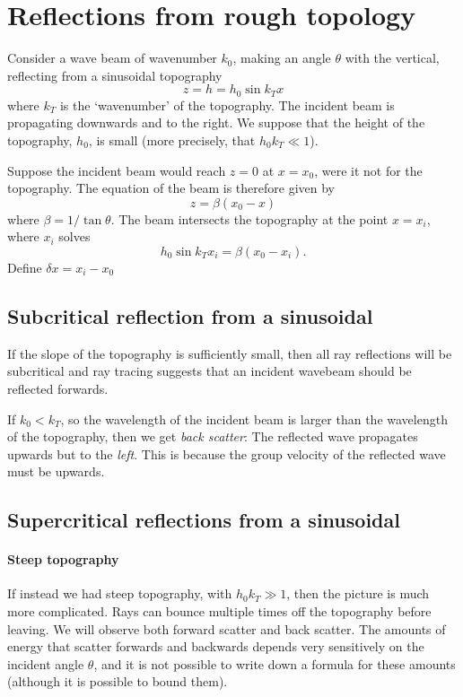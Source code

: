 \section{Reflections from rough topology}

Consider a wave beam of wavenumber $k_0$, making an angle $\theta$ with the
vertical, reflecting from a sinusoidal topography
\begin{equation}
    z = h = h_0 \sin k_T x
\end{equation}
where $k_T$ is the `wavenumber' of the topography. The incident beam is
propagating downwards and to the right. We suppose that the height of the
topography, $h_0$, is small (more precisely, that $h_0 k_T \ll 1$).

Suppose the incident beam would reach $z = 0$ at $x = x_0$, were it not for the
topography. The equation of the beam is therefore given by
\begin{equation}
    z = \beta (x_0 - x)
\end{equation}
where $\beta = 1/\tan \theta$. The beam intersects the topography at the point
$x = x_i$, where $x_i$ solves
\begin{equation}
    h_0 \sin k_T x_i = \beta (x_0 - x_i).
\end{equation}
Define $\delta x = x_i - x_0$

\subsection{Subcritical reflection from a sinusoidal}

If the slope of the topography is sufficiently small, then all ray reflections
will be subcritical and ray tracing suggests that an incident wavebeam should be
reflected forwards. 

If $k_0 < k_T$, so the wavelength of the incident beam is larger than the
wavelength of the topography, then we get \textit{back scatter}: The reflected
wave propagates upwards but to the \textit{left}. This is because the group
velocity of the reflected wave must be upwards.

\subsection{Supercritical reflections from a sinusoidal}

\paragraph{Steep topography} If instead we had steep topography, with $h_0 k_T
\gg 1$, then the picture is much more complicated. Rays can bounce multiple
times off the topography before leaving. We will observe both forward scatter
and back scatter. The amounts of energy that scatter forwards and backwards
depends very sensitively on the incident angle $\theta$, and it is not possible
to write down a formula for these amounts (although it is possible to bound
them).


